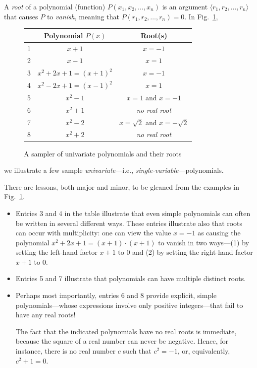 \bigskip


A {\it root}  of a polynomial (function) $P(x_1, x_2, \ldots, x_n)$ is an argument $\langle r_1, r_2, \ldots, r_n \rangle$ that causes $P$ to {\it vanish}, meaning that $P(r_1, r_2, \ldots, r_n) = 0$.  In Fig.~\ref{fig:sample-polys},
 \begin{figure}[htb]
\begin{center}
\begin{tabular}{|c|c|c|}
\hline
 & Polynomial $P(x)$ & Root(s) \\
\hline
1 &
$x+1$  &  $x= -1$ \\
2 &
$x-1$  &  $x= 1$ \\
3 &
$x^2 + 2x +1 = (x+1)^2$ & $x = -1$ \\ 
4 &
$x^2 - 2x +1 = (x-1)^2$ & $x = 1$ \\ 
5 &
$x^2 - 1$ & $x = 1$ and $x= -1$ \\
6 &
$x^2 + 1$ & {\em no real root} \\
7 &
$x^2 -2$  & $x = \sqrt{2}$ and $x = - \sqrt{2}$ \\
8 &
$x^2 + 2$ & {\em no real root} \\
\hline
\end{tabular}
\end{center} 
 \caption{A sampler of univariate polynomials and their roots}
 \label{fig:sample-polys}
 \end{figure}
we illustrate a few sample {\em univariate}---i.e., {\em single-variable}---polynomials.  

\medskip

\noindent
There are lessons, both major and minor, to be gleaned from the examples in Fig.~\ref{fig:sample-polys}.
\begin{itemize}
\item
Entries 3 and 4 in the table illustrate that even simple polynomials can often be written in several different ways.  These entries illustrate also that roots can occur with multiplicity: one can view the value $x = -1$ as causing the polynomial $x^2 + 2x +1 = (x+1)\cdot (x+1)$ to vanish
in two ways---(1) by setting the left-hand factor $x+1$ to $0$ and (2) by setting the right-hand factor $x+1$ to $0$.


\medskip\item
Entries 5 and 7 illustrate that polynomials can have multiple distinct roots.

\medskip\item
Perhaps most importantly, entries 6 and 8 provide explicit, simple polynomials---whose expressions involve only positive integers---that fail to have any real roots!

\smallskip

The fact that the indicated polynomials have no real roots is immediate, because the square of a real number can never be negative. Hence, for instance, there is no real number $c$ such that $c^2 = -1$, or, equivalently, $c^2 + 1 = 0$.
\end{itemize}

